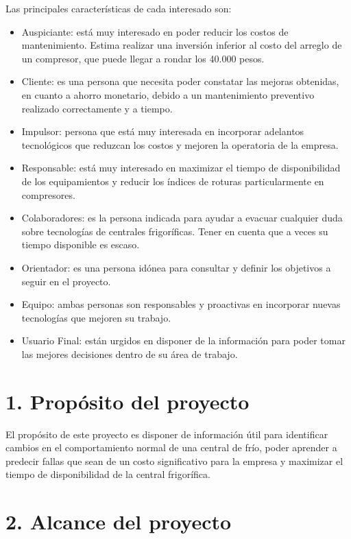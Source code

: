 \documentclass[
11pt, %
]{charter}
\begin{document}
Las principales características de cada interesado son:
\begin{itemize}
	\item Auspiciante: está muy interesado en poder reducir los costos de mantenimiento. Estima realizar una inversión inferior al costo del arreglo de un compresor, que puede llegar a rondar los 40.000 pesos.
	\item Cliente: es una persona que necesita poder constatar las mejoras obtenidas, en cuanto a ahorro monetario, debido a un mantenimiento preventivo realizado correctamente y a tiempo.
	\item Impulsor: persona que está muy interesada en incorporar adelantos tecnológicos que reduzcan los costos y mejoren la operatoria de la empresa.
	\item Responsable: está muy interesado en maximizar el tiempo de disponibilidad de los equipamientos y reducir los índices de roturas particularmente en compresores.
	\item Colaboradores: es la persona indicada para ayudar a evacuar cualquier duda sobre tecnologías de centrales frigoríficas. Tener en cuenta que a veces su tiempo disponible es escaso.
	\item Orientador: es una persona idónea para consultar y definir los objetivos a seguir en el proyecto.
	\item Equipo: ambas personas son responsables y proactivas en incorporar nuevas tecnologías que mejoren su trabajo.
	\item Usuario Final: están urgidos en disponer de la información para poder tomar las mejores decisiones dentro de su área de trabajo.
\end{itemize}

\section{1. Propósito del proyecto}
\label{sec:proposito}

El propósito de este proyecto es disponer de información útil para identificar cambios en el comportamiento normal de una central de frío, poder aprender a predecir fallas que sean de un costo significativo para la empresa y maximizar el tiempo de disponibilidad de la central frigorífica.

\section{2. Alcance del proyecto}
\label{sec:alcance}
\end{document}
